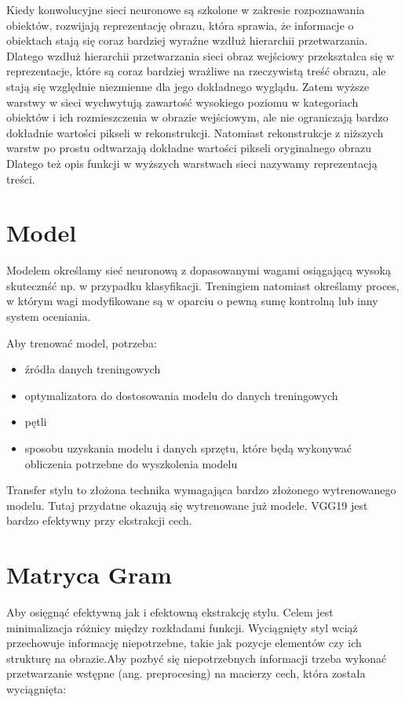 \documentclass[brudnopis]{xmgr}
\begin{document}
Kiedy konwolucyjne sieci neuronowe są szkolone w zakresie rozpoznawania obiektów, rozwijają reprezentację obrazu, która sprawia, że informacje o obiektach stają się coraz bardziej wyraźne wzdłuż hierarchii przetwarzania. Dlatego wzdłuż hierarchii przetwarzania sieci obraz wejściowy przekształca się w reprezentacje, które są coraz bardziej wrażliwe na rzeczywistą treść obrazu, ale stają się względnie niezmienne dla jego dokładnego wyglądu. Zatem wyższe warstwy w sieci wychwytują zawartość wysokiego poziomu w kategoriach obiektów i ich rozmieszczenia w obrazie wejściowym, ale nie ograniczają bardzo dokładnie wartości pikseli w rekonstrukcji. Natomiast rekonstrukcje z niższych warstw po prostu odtwarzają dokładne wartości pikseli oryginalnego obrazu Dlatego też opis funkcji w wyższych warstwach sieci nazywamy reprezentacją treści.


\section{Model\label{s:dsssl}}
Modelem określamy sieć neuronową z dopasowanymi wagami osiągającą wysoką skutecznść np. w przypadku klasyfikacji. Treningiem natomiast określamy proces, w którym wagi modyfikowane są w oparciu o pewną sumę kontrolną lub inny system oceniania.

Aby trenować model, potrzeba:

\begin{itemize}
\item źródła danych treningowych
\item optymalizatora do dostosowania modelu do danych treningowych 
\item pętli  
\item sposobu uzyskania modelu i danych sprzętu, które będą wykonywać obliczenia potrzebne do wyszkolenia modelu

\end{itemize}

Transfer stylu to złożona technika wymagająca bardzo złożonego wytrenowanego modelu. Tutaj przydatne okazują się wytrenowane już modele. VGG19 jest bardzo efektywny przy ekstrakcji cech.

\section{Matryca Gram\label{s:dsssl}}
Aby osięgnąć efektywną jak i efektowną ekstrakcję stylu. Celem jest minimalizacja różnicy między rozkładami funkcji. Wyciągnięty styl wciąż przechowuje informację niepotrzebne, takie jak pozycje elementów czy ich strukturę na obrazie.Aby pozbyć się niepotrzebnych informacji trzeba wykonać przetwarzanie wstępne (ang. preprocesing) na macierzy cech, która została wyciągnięta:
\end{document}
